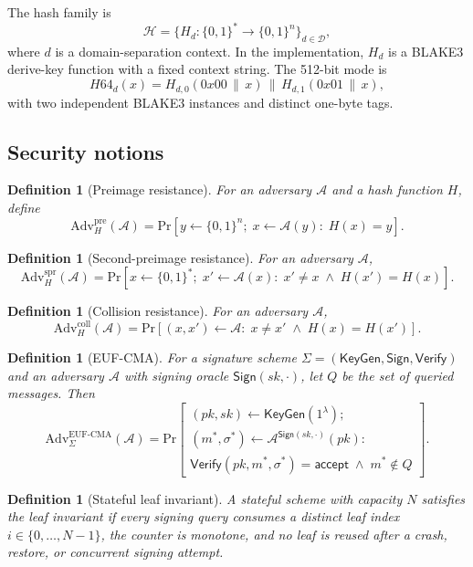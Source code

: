 \documentclass[11pt,a4paper]{article}
\newtheorem{definition}[theorem]{Definition}
\theoremstyle{remark}
\newcommand{\Adv}{\mathrm{Adv}}
\newcommand{\Prb}{\mathrm{Pr}}
\newcommand{\EUF}{\mathrm{EUF\text{-}CMA}}
\newcommand{\pre}{\mathrm{pre}}
\newcommand{\coll}{\mathrm{coll}}
\newcommand{\spr}{\mathrm{spr}}
\newcommand{\Hash}{\mathcal{H}}
\newcommand{\Ver}{\mathsf{Verify}}
\newcommand{\Sign}{\mathsf{Sign}}
\newcommand{\KeyGen}{\mathsf{KeyGen}}
\newcommand{\acc}{\mathsf{accept}}
\newcommand{\concat}{\,\|\,}
\newcommand{\bits}{\{0,1\}}
\begin{document}
The hash family is
\[
\Hash = \{H_d : \bits^* \to \bits^n\}_{d\in\mathcal{D}},
\]
where \(d\) is a domain-separation context. In the implementation, \(H_d\) is a
BLAKE3 derive-key function with a fixed context string. The 512-bit mode is
\[
H64_d(x)=H_{d,0}(0x00\concat x)\concat H_{d,1}(0x01\concat x),
\]
with two independent BLAKE3 instances and distinct one-byte tags.

\subsection{Security notions}

\begin{definition}[Preimage resistance]
For an adversary \(\mathcal{A}\) and a hash function \(H\), define
\[
\Adv^{\pre}_{H}(\mathcal{A})
=
\Prb\left[
y\leftarrow \bits^n;\; x\leftarrow\mathcal{A}(y):\; H(x)=y
\right].
\]
\end{definition}

\begin{definition}[Second-preimage resistance]
For an adversary \(\mathcal{A}\),
\[
\Adv^{\spr}_{H}(\mathcal{A})
=
\Prb\left[
x\leftarrow \bits^*;\; x'\leftarrow\mathcal{A}(x):\;
x'\ne x \;\wedge\; H(x')=H(x)
\right].
\]
\end{definition}

\begin{definition}[Collision resistance]
For an adversary \(\mathcal{A}\),
\[
\Adv^{\coll}_{H}(\mathcal{A})
=
\Prb\left[
(x,x')\leftarrow\mathcal{A}:\;
x\ne x' \;\wedge\; H(x)=H(x')
\right].
\]
\end{definition}

\begin{definition}[EUF-CMA]
For a signature scheme \(\Sigma=(\KeyGen,\Sign,\Ver)\) and an adversary
\(\mathcal{A}\) with signing oracle \(\Sign(sk,\cdot)\), let \(Q\) be the set of
queried messages. Then
\[
\Adv^{\EUF}_{\Sigma}(\mathcal{A})
=
\Prb\left[
\begin{array}{l}
(pk,sk)\leftarrow\KeyGen(1^\lambda);\\
(m^*,\sigma^*)\leftarrow\mathcal{A}^{\Sign(sk,\cdot)}(pk):\\
\Ver(pk,m^*,\sigma^*)=\acc \;\wedge\; m^*\notin Q
\end{array}
\right].
\]
\end{definition}

\begin{definition}[Stateful leaf invariant]
A stateful scheme with capacity \(N\) satisfies the leaf invariant if every
signing query consumes a distinct leaf index \(i\in\{0,\dots,N-1\}\), the
counter is monotone, and no leaf is reused after a crash, restore, or concurrent
signing attempt.
\end{definition}
\end{document}
